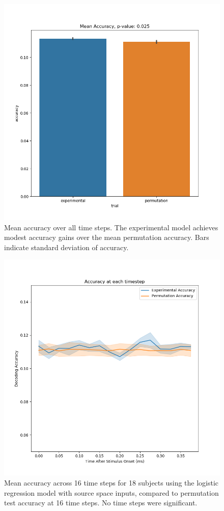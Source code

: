 \documentclass[../main.tex]{subfiles}
\begin{document}
\begin{figure}
    \centering
    \includegraphics[scale=0.7]{figures/results/accuracy_occipital316.png}
    \caption{Mean accuracy over all time steps. The experimental model achieves modest accuracy gains over the mean permutation accuracy. Bars indicate standard deviation of accuracy.}
    \label{mean_acc_logistic_sensor}
\end{figure}

\begin{figure}
    \centering
    \includegraphics[scale=0.7]{figures/results/timestep_accuracy_source.png}
    \caption{Mean accuracy across 16 time steps for 18 subjects using the logistic regression model with source space inputs, compared to permutation test accuracy at 16 time steps. No time steps were significant.}
    \label{timestep_logistic_source}
\end{figure}
\end{document}
